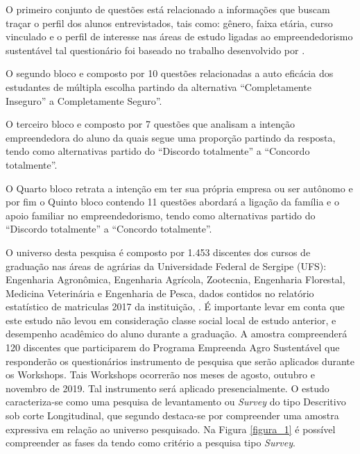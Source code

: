 O primeiro conjunto de questões está relacionado a informações que buscam traçar o perfil dos alunos entrevistados, tais como: gênero, faixa etária, curso vinculado e o perfil de interesse nas áreas de estudo ligadas ao empreendedorismo sustentável tal questionário foi baseado no trabalho desenvolvido por . 

O segundo bloco e composto por 10 questões relacionadas a auto eficácia dos estudantes de múltipla escolha partindo da alternativa “Completamente Inseguro” a Completamente Seguro”. 

O terceiro bloco e composto por 7 questões que analisam a intenção empreendedora do aluno da quais segue uma proporção partindo da resposta, tendo como alternativas partido do “Discordo totalmente” a “Concordo totalmente”.

O Quarto bloco retrata a intenção em ter sua própria empresa ou ser autônomo e por fim o Quinto bloco contendo 11 questões abordará a ligação da família e o apoio familiar no empreendedorismo, tendo como alternativas partido do “Discordo totalmente” a “Concordo totalmente”. 

O universo desta pesquisa é composto por 1.453 discentes dos cursos de graduação nas áreas de agrárias da Universidade Federal de Sergipe (UFS): Engenharia Agronômica, Engenharia Agrícola, Zootecnia, Engenharia Florestal, Medicina Veterinária e Engenharia de Pesca, dados contidos no relatório estatístico de matriculas 2017 da instituição, \cite{campelo_ufs_2018}. É importante levar em conta que este estudo não levou em consideração classe social local de estudo anterior, e desempenho acadêmico do aluno durante a graduação. 
A amostra compreenderá 120 discentes que participarem do Programa Empreenda Agro Sustentável que responderão os questionários instrumento de pesquisa que serão aplicados durante os Workshops. Tais Workshops ocorrerão nos meses de agosto, outubro e novembro de 2019. Tal instrumento será aplicado presencialmente. O estudo caracteriza-se como uma pesquisa de levantamento ou \textit{Survey} do tipo Descritivo sob corte Longitudinal, que segundo  destaca-se por compreender uma amostra expressiva em relação ao universo pesquisado. Na Figura \ref{figura_1} é possível compreender as fases da tendo como critério a pesquisa tipo \textit{Survey}.

